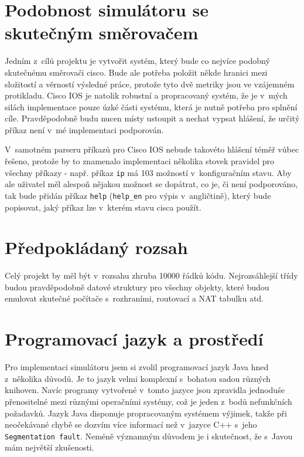 
\section{Podobnost simulátoru se skutečným směrovačem}\label{kap:podobnost}
Jedním z~cílů projektu je vytvořit systém, který bude co nejvíce podobný skutečnému směrovači cisco. Bude ale potřeba položit někde hranici mezi složitostí a věrností výsledné práce, protože tyto dvě metriky jsou ve vzájemném protikladu. Cisco IOS je natolik robustní a propracovaný systém, že je v~mých silách implementace pouze úzké části systému, která je nutně potřeba pro splnění cíle. Pravděpodobně budu nucen místy ustoupit a nechat vypsat hlášení, že určitý příkaz není v~mé implementaci podporován. 

V~samotném parseru příkazů pro Cisco IOS nebude takovéto hlášení téměř vůbec řešeno, protože by to znamenalo implementaci několika stovek pravidel pro všechny příkazy - např. příkaz \verb|ip| má 103 možností v~konfiguračním stavu. Aby ale uživatel měl alespoň nějakou možnost se dopátrat, co je, či není podporováno, tak bude přidán příkaz \verb|help| (\verb|help_en| pro výpis v~angličtině), který bude popisovat, jaký příkaz lze v~kterém stavu cisca použít.


\section{Předpokládaný rozsah}
Celý projekt by měl být v~rozsahu zhruba 10000 řádků kódu. Nejrozsáhlejší třídy budou pravděpodobně datové struktury pro všechny objekty, které budou emulovat skutečné počítače s~rozhraními, routovací a NAT tabulku atd.


\section{Programovací jazyk a prostředí}
Pro implementaci simulátoru jsem si zvolil programovací jazyk Java hned z~několika důvodů. Je to jazyk velmi komplexní s~bohatou sadou různých knihoven. Navíc programy vytvořené v~tomto jazyce jsou zpravidla jednoduše přenositelné mezi různými operačními systémy, což je jeden z~bodů nefunkčních požadavků. Jazyk Java disponuje propracovaným systémem výjimek, takže při neočekávané chybě se dozvím více informací než v~jazyce C++ s~jeho \verb|Segmentation fault|. Neméně významným důvodem je i skutečnost, že s~Javou mám největší zkušenosti.

